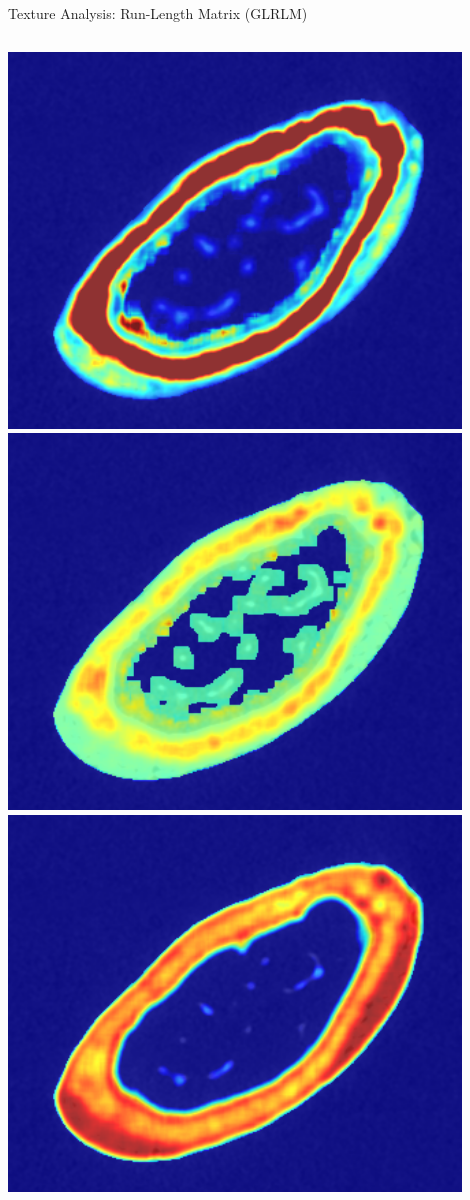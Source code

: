 \documentclass[10pt,aspectratio=169]{beamer}
\begin{document}
\begin{frame}{Texture Analysis: Run-Length Matrix (GLRLM)}
\begin{columns}[onlytextwidth]
\begin{columns}
    \includegraphics[width=0.9\textwidth]{./TextureMapsImages/GLRLM_49_LEFT_2_crop.png}
    \centering
    \includegraphics[width=0.9\textwidth]{./TextureMapsImages/GLRLM_49_LEFT_1_crop.png}\\
    \includegraphics[width=0.9\textwidth]{./TextureMapsImages/GLRLM_49_LEFT_3_crop.png}

\end{columns}
\end{columns}
\end{frame}
\end{document}
